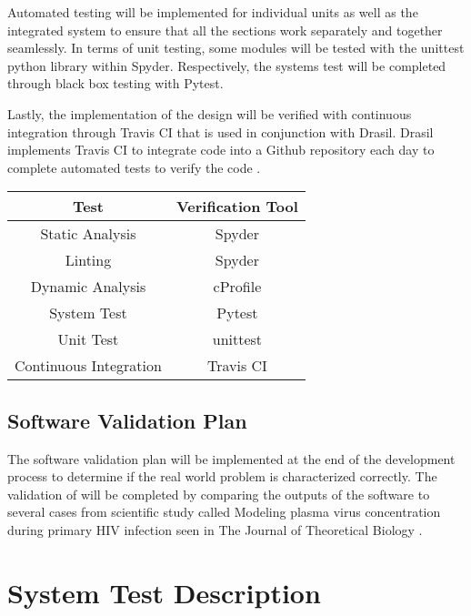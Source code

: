 \documentclass[12pt, titlepage]{article}
\begin{document}
Automated testing will be implemented for individual units as well as the 
integrated system to ensure that all the sections work separately and together 
seamlessly. In terms of unit  testing, some modules will be tested with the 
unittest python library within Spyder. Respectively, the systems test will be 
completed through black box testing with Pytest.

Lastly, the implementation of the design will be verified with continuous 
integration through Travis CI that is used in conjunction with Drasil. Drasil 
implements Travis CI to integrate code into a Github repository each day to 
complete automated tests to verify the code \citep{Drasil}. 

\begin{center}
 \begin{tabular}{||c|c||} 
 \hline
 \textbf{Test} & \textbf{Verification Tool}\\ [0.5ex] 
 \hline
  Static Analysis & Spyder\\
 \hline
  Linting & Spyder\\
 \hline
  Dynamic Analysis & cProfile \\
 \hline
  System Test & Pytest\\
 \hline
  Unit Test & unittest \\
 \hline
  Continuous Integration & Travis CI\\ [1ex] 
 \hline
\end{tabular}
\end{center}		

\newpage

\subsection{Software Validation Plan}

The software validation plan will be implemented at the end of the development 
process to determine if the real world problem is characterized correctly. The 
validation of \progname{} will be completed by comparing the outputs of the 
software to several cases from scientific study called Modeling plasma virus 
concentration during primary HIV infection seen in The Journal of Theoretical 
Biology
\citep{Stafford2000}.

\section{System Test Description} \label{systestcases}
\end{document}
